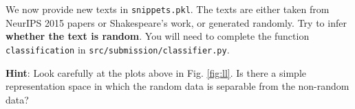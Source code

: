 \item {}

We now provide new texts in \texttt{snippets.pkl}. The texts are either taken from NeurIPS 2015 papers or Shakespeare’s work, 
or generated randomly. Try to infer \textbf{whether the text is random}. You will need to complete the function \texttt{classification} in 
\texttt{src/submission/classifier.py}.

\textbf{Hint}: Look carefully at the plots above in Fig. \ref{fig:ll}. Is there a simple representation space in which the 
random data is separable from the non-random data?

